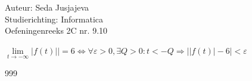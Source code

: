\documentclass[a4paper]{article}
\begin{document}
\noindent \large Auteur: Seda Jusjajeva\\
\noindent \large Studierichting: Informatica\\
\noindent \large Oefeningenreeks 2C nr. 9.10 \\

\medskip

\normalsize

$\lim\limits_{t\rightarrow-\infty}\lvert f(t)\rvert| = 6 \Leftrightarrow \forall\varepsilon > 0, \exists Q > 0 : t < -Q \Rightarrow \lvert\lvert f(t)\rvert -6\rvert <\varepsilon$ \\



\begin{thebibliography}{999}
\end{thebibliography}
\end{document}
